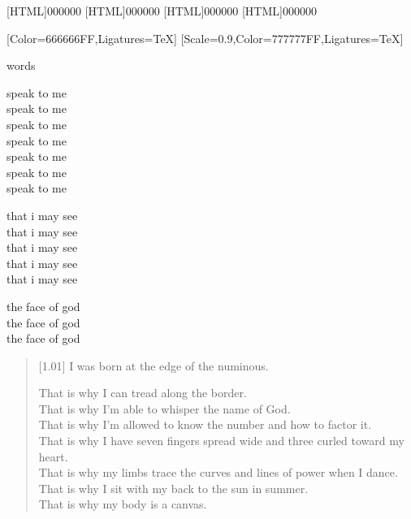 [HTML]{000000}
[HTML]{000000}
[HTML]{000000}
[HTML]{000000}
\begin{paracol}{2}
[Color=666666FF,Ligatures=TeX]
\renewfontfamily{}[Scale=0.9,Color=777777FF,Ligatures=TeX]
\null
\vfill
\begin{center}
    words
\end{center}
\vfill
\newpage

\null
\vfill
\begin{center}
\begin{Spacing}{0}
speak to me\\\vspace{-7pt}
speak to me\\\vspace{-7pt}
speak to me\\\vspace{-7pt}
speak to me\\\vspace{-7pt}
speak to me\\\vspace{-7pt}
speak to me\\\vspace{-7pt}
speak to me

that i may see\\\vspace{-7pt}
that i may see\\\vspace{-7pt}
that i may see\\\vspace{-7pt}
that i may see\\\vspace{-7pt}
that i may see

the face of god\\\vspace{-7pt}
the face of god\\\vspace{-7pt}
the face of god
\end{Spacing}
\end{center}
\vfill
\newpage

\begin{verse}[1.01\textwidth]
    I was born at the edge of the numinous.\vspace{-7pt}

    That is why I can tread along the border.\\
    That is why I'm able to whisper the name of God.\\
    That is why I'm allowed to know the number and how to factor it.\\
    That is why I have seven fingers spread wide and three curled toward my heart.\\
    That is why my limbs trace the curves and lines of power when I dance.\\
    That is why I sit with my back to the sun in summer.\\
    That is why my body is a canvas.\vspace{-7pt}


\end{verse}
\end{paracol}
